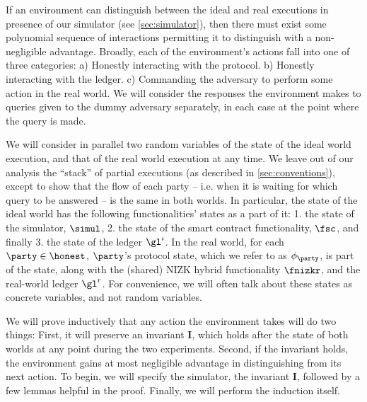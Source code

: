 If an environment can distinguish between the ideal and real executions in
presence of our simulator (see \autoref{sec:simulator}), then there must exist
some polynomial sequence of interactions permitting it to distinguish with a
non-negligible advantage. Broadly, each of the environment's actions fall into
one of three categories: a) Honestly interacting with the protocol. b) Honestly
interacting with the ledger. c) Commanding the adversary to perform some action
in the real world. We will consider the responses the environment makes to
queries given to the dummy adversary separately, in each case at the point where
the query is made.

We will consider in parallel two random variables of the state of the ideal
world execution, and that of the real world execution at any time. We leave out
of our analysis the ``stack'' of partial executions (as described in
\autoref{sec:conventions}), except to show that the flow of each party -- i.e.
when it is waiting for which query to be answered -- is the same in both worlds.
In particular, the state of the ideal world has the following
functionalities' states as a part of it: 1. the state of the simulator,
$\simul$, 2. the state of the smart contract functionality, $\fsc$, and finally
3. the state of the ledger $\gl^i$. In the real world, for each $\party \in
\honest$, $\party$'s protocol state, which we refer to as $\phi_\party$, is part
of the state, along with the (shared) NIZK hybrid functionality $\fnizkr$, and
the real-world ledger $\gl^r$. For convenience, we will often talk about these
states as concrete variables, and not random variables.

We will prove inductively that any action the environment takes will do two
things: First, it will preserve an invariant $\boldsymbol I$, which holds after
the state of both worlds at any point during the two experiments. Second, if the
invariant holds, the environment gains at most negligible advantage in
distinguishing from its next action. To begin, we will specify the simulator,
the invariant $\boldsymbol I$, followed by a few lemmas helpful in the proof.
Finally, we will perform the induction itself.

